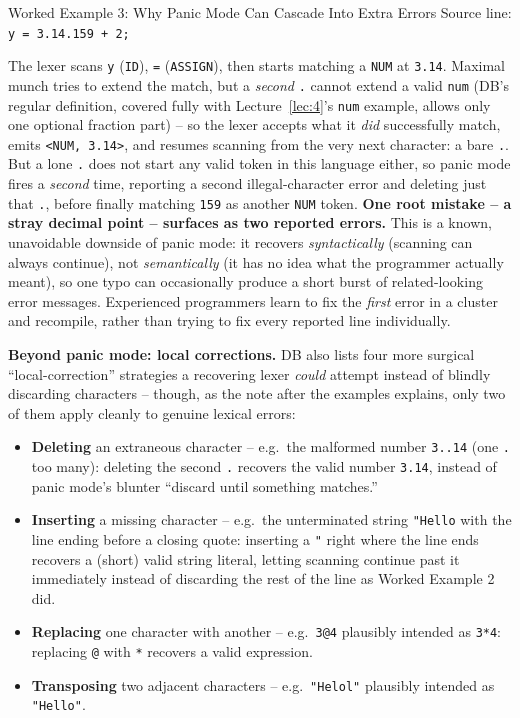 \documentclass[full-course-notes.tex]{subfiles}
\begin{document}
\begin{examplebox}{Worked Example 3: Why Panic Mode Can Cascade Into Extra Errors}
Source line: \quad \texttt{y = 3.14.159 + 2;}

The lexer scans \texttt{y} (\texttt{ID}), \texttt{=} (\texttt{ASSIGN}), then starts matching a
\texttt{NUM} at \texttt{3.14}. Maximal munch tries to extend the match, but a \emph{second}
\texttt{.} cannot extend a valid \texttt{num} (DB's regular definition, covered fully with
Lecture~\ref{lec:4}'s \texttt{num} example, allows only one optional fraction part) -- so the lexer accepts what it \emph{did}
successfully match, emits \texttt{<NUM, 3.14>}, and resumes scanning from the very next
character: a bare \texttt{.}. But a lone \texttt{.} does not start any valid token in this
language either, so panic mode fires a \emph{second} time, reporting a second illegal-character
error and deleting just that \texttt{.}, before finally matching \texttt{159} as another
\texttt{NUM} token. \textbf{One root mistake -- a stray decimal point -- surfaces as two
reported errors.} This is a known, unavoidable downside of panic mode: it recovers
\emph{syntactically} (scanning can always continue), not \emph{semantically} (it has no idea
what the programmer actually meant), so one typo can occasionally produce a short burst of
related-looking error messages. Experienced programmers learn to fix the \emph{first} error in
a cluster and recompile, rather than trying to fix every reported line individually.
\end{examplebox}

\dbtag \textbf{Beyond panic mode: local corrections.} DB also lists four more surgical
``local-correction'' strategies a recovering lexer \emph{could} attempt instead of blindly
discarding characters -- though, as the note after the examples explains, only two of them
apply cleanly to genuine lexical errors:

\begin{itemize}
  \item \textbf{Deleting} an extraneous character -- e.g.\ the malformed number
  \texttt{3..14} (one \texttt{.} too many): deleting the second \texttt{.} recovers the valid
  number \texttt{3.14}, instead of panic mode's blunter ``discard until something matches.''
  \item \textbf{Inserting} a missing character -- e.g.\ the unterminated string \texttt{"Hello}
  with the line ending before a closing quote: inserting a \texttt{"} right where the line ends
  recovers a (short) valid string literal, letting scanning continue past it immediately
  instead of discarding the rest of the line as Worked Example 2 did.
  \item \textbf{Replacing} one character with another -- e.g.\ \texttt{3@4} plausibly intended
  as \texttt{3*4}: replacing \texttt{@} with \texttt{*} recovers a valid expression.
  \item \textbf{Transposing} two adjacent characters -- e.g.\ \texttt{"Helol"} plausibly
  intended as \texttt{"Hello"}.
\end{itemize}
\end{document}
